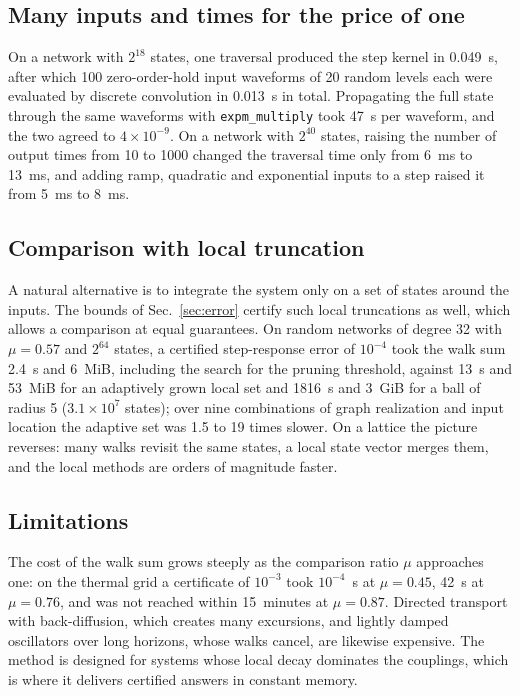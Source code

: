 \documentclass[aps,pra,superscriptaddress,floatfix,longbibliography,twocolumn]{revtex4-2}
\begin{document}
\subsection{Many inputs and times for the price of one}\label{sec:batch}
On a network with $2^{18}$ states, one traversal produced the step kernel in 0.049~s, after which 100 zero-order-hold input waveforms of 20 random levels each were evaluated by discrete convolution in 0.013~s in total. Propagating the full state through the same waveforms with \texttt{expm\_multiply} took 47~s per waveform, and the two agreed to $4\times10^{-9}$. On a network with $2^{40}$ states, raising the number of output times from 10 to 1000 changed the traversal time only from 6~ms to 13~ms, and adding ramp, quadratic and exponential inputs to a step raised it from 5~ms to 8~ms.

\subsection{Comparison with local truncation}\label{sec:crossover}
A natural alternative is to integrate the system only on a set of states around the inputs. The bounds of Sec.~\ref{sec:error} certify such local truncations as well, which allows a comparison at equal guarantees. On random networks of degree 32 with $\mu=0.57$ and $2^{64}$ states, a certified step-response error of $10^{-4}$ took the walk sum 2.4~s and 6~MiB, including the search for the pruning threshold, against 13~s and 53~MiB for an adaptively grown local set and 1816~s and 3~GiB for a ball of radius 5 ($3.1\times10^7$ states); over nine combinations of graph realization and input location the adaptive set was 1.5 to 19 times slower. On a lattice the picture reverses: many walks revisit the same states, a local state vector merges them, and the local methods are orders of magnitude faster.

\subsection{Limitations}\label{sec:hard}
The cost of the walk sum grows steeply as the comparison ratio $\mu$ approaches one: on the thermal grid a certificate of $10^{-3}$ took $10^{-4}$~s at $\mu=0.45$, 42~s at $\mu=0.76$, and was not reached within 15~minutes at $\mu=0.87$. Directed transport with back-diffusion, which creates many excursions, and lightly damped oscillators over long horizons, whose walks cancel, are likewise expensive. The method is designed for systems whose local decay dominates the couplings, which is where it delivers certified answers in constant memory.
\end{document}
